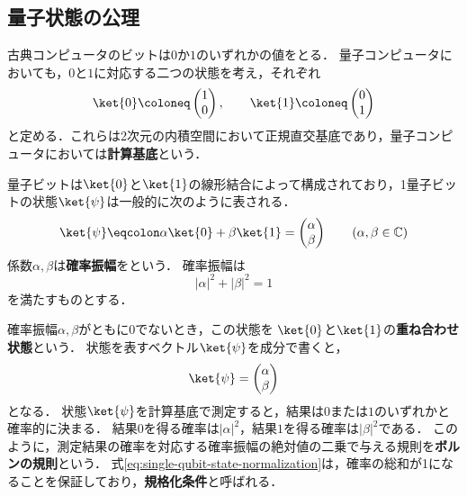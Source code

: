 \subsection{量子状態の公理}

\begin{defi}[計算基底]
古典コンピュータのビットは$0$か$1$のいずれかの値をとる．
量子コンピュータにおいても，$0$と$1$に対応する二つの状態を考え，それぞれ
\begin{equation*}
  \ket{0}\coloneq\begin{pmatrix}1\\0\end{pmatrix},
  \qquad
  \ket{1}\coloneq\begin{pmatrix}0\\1\end{pmatrix}
\end{equation*}
と定める．これらは2次元の内積空間において正規直交基底であり，量子コンピュータにおいては\textbf{計算基底}という．

量子ビットは$\ket{0}$と$\ket{1}$の線形結合によって構成されており，1量子ビットの状態$\ket{\psi}$は一般的に次のように表される．
\begin{equation*}
  \ket{\psi}\eqcolon\alpha\ket{0}+\beta\ket{1} = \begin{pmatrix}\alpha\\\beta\end{pmatrix}
  \qquad
  (\alpha,\beta\in\mathbb C)
\end{equation*}
係数$\alpha,\beta$は\textbf{確率振幅}をという．
確率振幅は
\begin{equation}
  |\alpha|^2+|\beta|^2=1
  \label{eq:single-qubit-state-normalization}
\end{equation}
を満たすものとする．
\end{defi}

確率振幅$\alpha,\beta$がともに$0$でないとき，この状態を
$\ket{0}$と$\ket{1}$の\textbf{重ね合わせ状態}という．
状態を表すベクトル$\ket{\psi}$を成分で書くと，
\begin{equation*}
  \ket{\psi}=
  \begin{pmatrix}
    \alpha\\\beta
  \end{pmatrix}
\end{equation*}
となる．
状態$\ket{\psi}$を計算基底で測定すると，結果は$0$または$1$のいずれかと確率的に決まる．
結果$0$を得る確率は$|\alpha|^2$，結果$1$を得る確率は$|\beta|^2$である．
このように，測定結果の確率を対応する確率振幅の絶対値の二乗で与える規則を\textbf{ボルンの規則}という．
式\eqref{eq:single-qubit-state-normalization}は，確率の総和が1になることを保証しており，\textbf{規格化条件}と呼ばれる．

